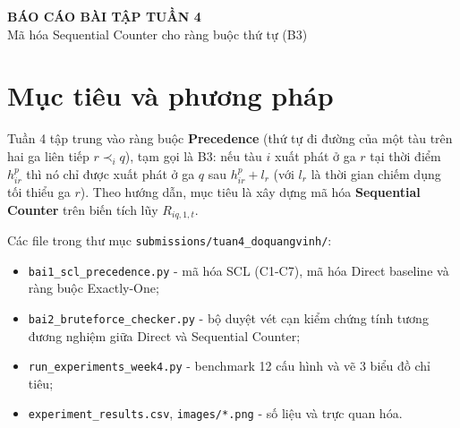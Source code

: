 \documentclass[12pt, a4paper]{article}
\begin{document}
\begin{center}
    {\Large \textbf{BÁO CÁO BÀI TẬP TUẦN 4}}\\[0.3em]
    {\large Mã hóa Sequential Counter cho ràng buộc thứ tự (B3)}
\end{center}

\section{Mục tiêu và phương pháp}
Tuần 4 tập trung vào ràng buộc \textbf{Precedence} (thứ tự đi đường của một tàu trên hai ga liên tiếp $r \prec_i q$), tạm gọi là B3: nếu tàu $i$ xuất phát ở ga $r$ tại thời điểm $h_{ir}^{p}$ thì nó chỉ được xuất phát ở ga $q$ sau $h_{ir}^{p} + l_r$ (với $l_r$ là thời gian chiếm dụng tối thiểu ga $r$). Theo hướng dẫn, mục tiêu là xây dựng mã hóa \textbf{Sequential Counter} trên biến tích lũy $R_{iq,1,t}$.

Các file trong thư mục \texttt{submissions/tuan4\_doquangvinh/}:
\begin{itemize}
    \item \texttt{bai1\_scl\_precedence.py} - mã hóa SCL (C1-C7), mã hóa Direct baseline và ràng buộc Exactly-One;
    \item \texttt{bai2\_bruteforce\_checker.py} - bộ duyệt vét cạn kiểm chứng tính tương đương nghiệm giữa Direct và Sequential Counter;
    \item \texttt{run\_experiments\_week4.py} - benchmark 12 cấu hình và vẽ 3 biểu đồ chỉ tiêu;
    \item \texttt{experiment\_results.csv}, \texttt{images/*.png} - số liệu và trực quan hóa.
\end{itemize}
\end{document}

